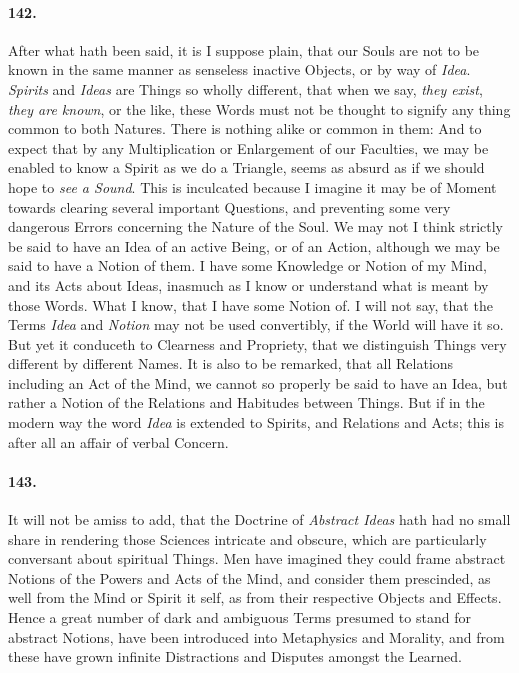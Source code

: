 \documentclass[]{article}
\newenvironment{sectionbody}{\begin{multicols}{2}}{\end{multicols}}
\begin{document}
\begin{sectionbody}
\paragraph{142.} After what hath been said, it is I suppose plain, that our Souls
are not to be known in the same manner as senseless inactive
Objects, or by way of \emph{Idea}. \emph{Spirits} and
\emph{Ideas} are Things so wholly different, that when we say,
\emph{they exist}, \emph{they are known}, or the like, these
Words must not be thought to signify any thing common to both
Natures.  There is nothing alike or common in them: And to expect
that by any Multiplication or Enlargement of our Faculties, we
may be enabled to know a Spirit as we do a Triangle, seems as
absurd as if we should hope to \emph{see a Sound}.  This is
inculcated because I imagine it may be of Moment towards clearing
several important Questions, and preventing some very dangerous
Errors concerning the Nature of the Soul.  We may not I think
strictly be said to have an Idea of an active Being, or
of an Action, although we may be said to have a Notion
of them.  I have some Knowledge or Notion of my Mind, and its
Acts about Ideas, inasmuch as I know or understand what is meant
by those Words.  What I know, that I have some Notion of.  I will
not say, that the Terms \emph{Idea} and \emph{Notion} may not
be used convertibly, if the World will have it so.  But yet it
conduceth to Clearness and Propriety, that we distinguish Things
very different by different Names.  It is also to be remarked,
that all Relations including an Act of the Mind, we cannot so
properly be said to have an Idea, but rather a Notion of the
Relations and Habitudes between Things.  But if in the modern way
the word \emph{Idea} is extended to Spirits, and Relations and
Acts; this is after all an affair of verbal Concern.



\paragraph{143.} It will not be amiss to add, that the Doctrine of \emph{Abstract
Ideas} hath had no small share in rendering those Sciences
intricate and obscure, which are particularly conversant about
spiritual Things.  Men have imagined they could frame abstract
Notions of the Powers and Acts of the Mind, and consider them
prescinded, as well from the Mind or Spirit it self, as from
their respective Objects and Effects.  Hence a great number of
dark and ambiguous Terms presumed to stand for abstract Notions,
have been introduced into Metaphysics and Morality, and from
these have grown infinite Distractions and Disputes amongst the
Learned.




\end{sectionbody}
\end{document}
